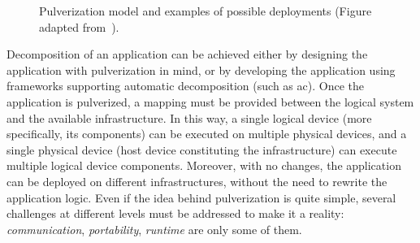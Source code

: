 \documentclass[12pt,a4paper]{article}
\begin{document}
\begin{figure}[ht]
\begin{minipage}{\columnwidth}
\begin{minipage}{0.48\columnwidth}
		\end{minipage}
	\end{minipage}

	\caption{
		Pulverization model and examples of possible deployments (Figure adapted from~\cite{DBLP:journals/fi/CasadeiPPVW20}).
	}
	\label{fig:pulv}
\end{figure}
%
Decomposition of an application can be achieved either by designing the application with pulverization in mind,
or by developing the application using frameworks supporting automatic decomposition (such as \ac{ac}).
%
Once the application is pulverized,
a mapping must be provided between the logical system and the available infrastructure.
%
In this way,
a single logical device (more specifically, its components) can be executed on multiple physical devices,
and a single physical device (host device constituting the infrastructure) can execute multiple logical device components.
%
Moreover,
with no changes,
the application can be deployed on different infrastructures,
without the need to rewrite the application logic.
%
Even if the idea behind pulverization is quite simple,
several challenges at different levels must be addressed to make it a reality:
\emph{communication}, \emph{portability}, \emph{runtime} are only some of them.
\end{document}

